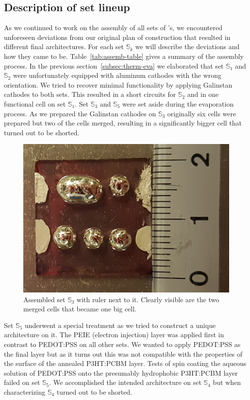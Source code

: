 \clearpage
\twocolumn

\subsection{Description of set lineup}
As we continued to work on the assembly of all sets of \BHSC's, we encountered unforeseen deviations from our original plan of construction that resulted in different final architectures. For each set $\mathbb{S}_k$ we will describe the deviations and how they came to be. Table~\ref{tab:assemb-table} gives a summary of the assembly process.\mypar
In the previous section~\ref{subsec:therm-eva} we elaborated that set $\mathbb{S}_1$ and $\mathbb{S}_2$ were unfortunately equipped with aluminum cathodes with the wrong orientation. We tried to recover minimal functionality by applying Galinstan cathodes to both sets. This resulted in a short circuits for $\mathbb{S}_2$ and in one functional cell on set $\mathbb{S}_1$.\mypar
Set $\mathbb{S}_3$ and $\mathbb{S}_5$ were set aside during the evaporation process. As we prepared the Galinstan cathodes on $\mathbb{S}_3$ originally six cells were prepared but two of the cells merged, resulting in a significantly bigger cell that turned out to be shorted.

\begin{figure}[h]\centering
\includegraphics[width=0.9\columnwidth]{../1_Pictures/cell3.png}
\caption{Assembled set $\mathbb{S}_3$ with ruler next to it. Clearly visible are the two merged cells that became one big cell.}
\end{figure}
Set $\mathbb{S}_5$ underwent a special treatment as we tried to construct a unique architecture on it. The PEIE (electron injection) layer was applied first in contrast to PEDOT:PSS on all other sets. We wanted to apply PEDOT:PSS as the final layer but as it turns out this was not compatible with the properties of the surface of the annealed P3HT:PCBM layer. Tests of spin coating the aqueous solution of PEDOT:PSS onto the presumably hydrophobic P3HT:PCBM layer failed on set $\mathbb{S}_5$.\mypar
We accomplished the intended architecture on set $\mathbb{S}_4$ but when characterizing $\mathbb{S}_4$ turned out to be shorted.


